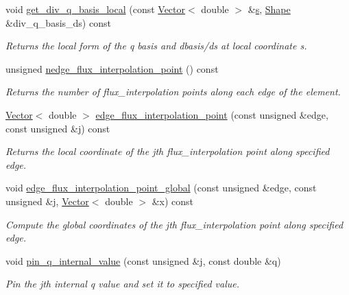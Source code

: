\begin{DoxyCompactItemize}
void \hyperlink{classoomph_1_1TAxisymmetricPoroelasticityElement_a9d5dc0246e71dce2e217a45754d05472}{get\+\_\+div\+\_\+q\+\_\+basis\+\_\+local} (const \hyperlink{classoomph_1_1Vector}{Vector}$<$ double $>$ \&\hyperlink{cfortran_8h_ab7123126e4885ef647dd9c6e3807a21c}{s}, \hyperlink{classoomph_1_1Shape}{Shape} \&div\+\_\+q\+\_\+basis\+\_\+ds) const
\begin{DoxyCompactList}\small\item\em Returns the local form of the q basis and dbasis/ds at local coordinate s. \end{DoxyCompactList}\item 
unsigned \hyperlink{classoomph_1_1TAxisymmetricPoroelasticityElement_abe8ce45bd70932c365623a1919c69e5d}{nedge\+\_\+flux\+\_\+interpolation\+\_\+point} () const
\begin{DoxyCompactList}\small\item\em Returns the number of flux\+\_\+interpolation points along each edge of the element. \end{DoxyCompactList}\item 
\hyperlink{classoomph_1_1Vector}{Vector}$<$ double $>$ \hyperlink{classoomph_1_1TAxisymmetricPoroelasticityElement_a2e9c7f4c54eb8e2ef7c1a6f7b058fc0a}{edge\+\_\+flux\+\_\+interpolation\+\_\+point} (const unsigned \&edge, const unsigned \&j) const
\begin{DoxyCompactList}\small\item\em Returns the local coordinate of the jth flux\+\_\+interpolation point along specified edge. \end{DoxyCompactList}\item 
void \hyperlink{classoomph_1_1TAxisymmetricPoroelasticityElement_a06f4ef6b5eeb141500e04e14ae673c39}{edge\+\_\+flux\+\_\+interpolation\+\_\+point\+\_\+global} (const unsigned \&edge, const unsigned \&j, \hyperlink{classoomph_1_1Vector}{Vector}$<$ double $>$ \&x) const
\begin{DoxyCompactList}\small\item\em Compute the global coordinates of the jth flux\+\_\+interpolation point along specified edge. \end{DoxyCompactList}\item 
void \hyperlink{classoomph_1_1TAxisymmetricPoroelasticityElement_a8b9632f528a6ba2c049a218bc09364d1}{pin\+\_\+q\+\_\+internal\+\_\+value} (const unsigned \&j, const double \&q)
\begin{DoxyCompactList}\small\item\em Pin the jth internal q value and set it to specified value. \end{DoxyCompactList}\item 

\end{DoxyCompactItemize}
